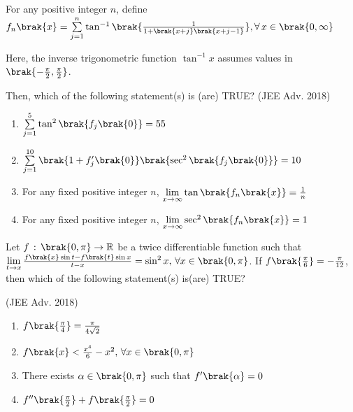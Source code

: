 \item 
For any positive integer $n$, define ${f_{n}\brak{x}=\sum\limits_{j=1}^{n}\tan^{-1}\brak{\frac{1}{1+\brak{x+j}\brak{x+j-1}}},\forall\,x\in\brak{0,\infty}}$

Here, the inverse trigonometric function $\tan^{-1}x$ assumes values in $\brak{-\frac{\pi}{2},\frac{\pi}{2}}$.

Then, which of the following statement(s) is (are) TRUE? \hfill{(JEE Adv. 2018)}

\begin{enumerate}
\item $\sum\limits_{j=1}^{5}\tan^{2}\brak{f_{j}\brak{0}}=55$

\item $\sum\limits_{j=1}^{10}\brak{1+f_{j}^{\prime}\brak{0}}\brak{\sec^{2}\brak{f_{j}\brak{0}}}=10$

\item For any fixed positive integer $n$, $\lim\limits_{x\to\infty}\tan\brak{f_{n}\brak{x}}=\frac{1}{n}$

\item For any fixed positive integer $n$, $\lim\limits_{x\to\infty}\sec^{2}\brak{f_{n}\brak{x}}=1$
\end{enumerate}

\item 
Let $f\,:\,\brak{0,\pi}\to\mathbb{R}$ be a twice differentiable function such that ${\lim\limits_{t\to x}\frac{f\brak{x}\sin t-f\brak{t}\sin x}{t-x}=\sin^{2}x,\,\forall x\in\brak{0,\pi}}$. If $f\brak{\frac{\pi}{6}}=-\frac{\pi}{12}$, then which of the following statement(s) is(are) TRUE? 

\hfill{(JEE Adv. 2018)}

\begin{enumerate}
\item $f\brak{\frac{\pi}{4}}=\frac{\pi}{4\sqrt{2}}$

\item $f\brak{x}<\frac{x^{4}}{6}-x^{2},\,\forall x\in\brak{0,\pi}$

\item There exists $\alpha\in\brak{0,\pi}$ such that $f^{\prime}\brak{\alpha}=0$

\item $f^{\prime\prime}\brak{\frac{\pi}{2}}+f\brak{\frac{\pi}{2}}=0$
\end{enumerate}

